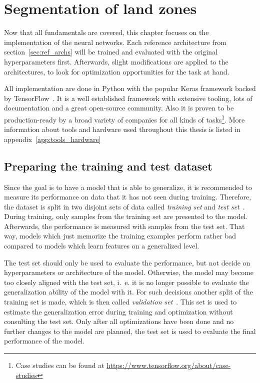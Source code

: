 \section{Segmentation of land zones}
\label{sec:segmentation}

Now that all fundamentals are covered, this chapter focuses on the implementation of the neural networks. Each reference architecture from section~\ref{sec:ref_archs} will be trained and evaluated with the original hyperparameters first. Afterwards, slight modifications are applied to the architectures, to look for optimization opportunities for the task at hand.

All implementation are done in Python with the popular Keras framework backed by TensorFlow~\cite{tf_whitepaper15}. It is a well established framework with extensive tooling, lots of documentation and a great open-source community. Also it is proven to be production-ready by a broad variety of companies for all kinds of tasks\footnote{Case studies can be found at \url{https://www.tensorflow.org/about/case-studies}}. More information about tools and hardware used throughout this thesis is listed in appendix~\ref{app:tools_hardware}

\subsection{Preparing the training and test dataset}
\label{sec:prepare_train_test}

Since the goal is to have a model that is able to generalize, it is recommended to measure its performance on data that it has not seen during training. Therefore, the dataset is split in two disjoint sets of data called \emph{training set} and \emph{test set}~\cite[p.~101f]{DLbook16}. During training, only samples from the training set are presented to the model. Afterwards, the performance is measured with samples from the test set. That way, models which just memorize the training examples perform rather bad compared to models which learn features on a generalized level.

The test set should only be used to evaluate the performance, but not decide on hyperparameters or architecture of the model. Otherwise, the model may become too closely aligned with the test set, i.~e. it is no longer possible to evaluate the generalization ability of the model with it. For such decisions another split of the training set is made, which is then called \emph{validation set}~\cite[p.~119]{DLbook16}. This set is used to estimate the generalization error during training and optimization without consulting the test set. Only after all optimizations have been done and no further changes to the model are planned, the test set is used to evaluate the final performance of the model.

